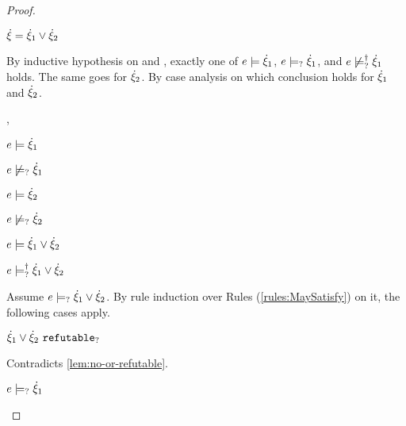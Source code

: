 \begin{proof}
\begin{byCases}
\item[\text{(\ref{rule:CTOr})}]
    \begin{pfsteps*}
    \item $\dot{\xi}=\dot{\xi}_1 \vee \dot{\xi}_2$ 
    \end{pfsteps*}
    By inductive hypothesis on  and , exactly one of $e \models \dot{\xi}_1$, $e \models_{?} \dot{\xi}_1$, and $e \not\models_{?}^{\dag} \dot{\xi}_1$ holds. The same goes for $\dot{\xi}_2$. By case analysis on which conclusion holds for $\dot{\xi}_1$ and $\dot{\xi}_2$.
    \begin{byCases}
    \item[\csatisfy{e}{\hxi_1},\csatisfy{e}{\hxi_2}]
        \begin{pfsteps*}
        \item $e \models \dot{\xi}_1$  
        \item $e \not\models_{?} \dot{\xi}_1$  
        \item $e \models \dot{\xi}_2$  
        \item $e \not\models_{?} \dot{\xi}_2$  
        \item $e \models \dot{\xi}_1 \vee \dot{\xi}_2$  
        \item $e \models_{?}^{\dag} \dot{\xi}_1 \vee \dot{\xi}_2$ 
        \end{pfsteps*}
        Assume $e \models_{?} \dot{\xi}_1 \vee \dot{\xi}_2$. By rule induction over Rules (\ref{rules:MaySatisfy}) on it, the following cases apply.
        \begin{byCases}
        \item[\text{(\ref{rule:CMSNotIntro})}]
            \begin{pfsteps*}
            \item $\dot{\xi}_1 \vee \dot{\xi}_2 ~\mathtt{refutable}_?$ 
            \end{pfsteps*}
            Contradicts \autoref{lem:no-or-refutable}.
        \item[\text{(\ref{rule:CMSOr1})}]
            \begin{pfsteps*}
            \item $e \models_{?} \dot{\xi}_1$ 
            \end{pfsteps*}

\end{byCases}
\end{byCases}
\end{byCases}
\end{proof}

